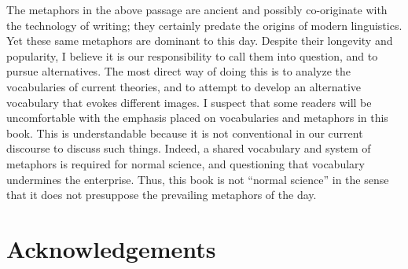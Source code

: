 The metaphors in the above passage are ancient and possibly co-originate with the technology of writing; they certainly predate the origins of modern linguistics. Yet these same metaphors are dominant to this day. Despite their longevity and popularity, I believe it is our responsibility to call them into question, and to pursue alternatives. The most direct way of doing this is to analyze the vocabularies of current theories, and to attempt to develop an alternative vocabulary that evokes different images. I suspect that some readers will be uncomfortable with the emphasis placed on vocabularies and metaphors in this book. This is understandable because it is not conventional in our current discourse to discuss such things. Indeed, a shared vocabulary and system of metaphors is required for normal science, and questioning that vocabulary undermines the enterprise. Thus, this book is not “normal science” in the sense that it does not presuppose the prevailing metaphors of the day.

\chapter{Acknowledgements}

